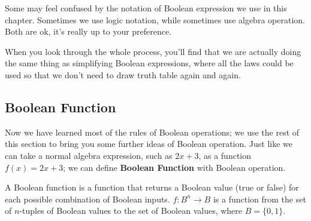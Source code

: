         \begin{remark}
            Some may feel confused by the notation of Boolean expression we use in this chapter.
            Sometimes we use logic notation, while sometimes use algebra operation. Both are ok,
            it's really up to your preference.
        \end{remark}
        When you look through the whole process, you'll find that we are actually doing the same
        thing as simplifying Boolean expressions, where all the laws could be used so that we don't
        need to draw truth table again and again.

        \subsection{Boolean Function}
        Now we have learned most of the rules of Boolean operations; we use the rest of this section
        to bring you some further ideas of Boolean operation. Just like we can take a normal algebra
        expression, such as $2x+3$, as a function $f(x)=2x+3$; we can define \textbf{Boolean Function}
        with Boolean operation.
        \begin{definition}
        A Boolean function is a function that returns a Boolean value (true or false) for each possible combination of Boolean inputs. 
        $f: B^n \rightarrow B$ is a function from the set of  $n$-tuples of Boolean values to the set of Boolean values, where  $B = \{0, 1\}$.
        \end{definition} 




